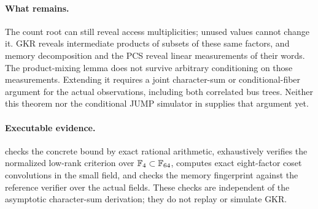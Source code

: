 \paragraph{What remains.} The count root can still reveal access multiplicities; unused values cannot change it. GKR reveals intermediate products of subsets of these same factors, and memory decomposition and the PCS reveal linear measurements of their words. The product-mixing lemma does not survive arbitrary conditioning on those measurements. Extending it requires a joint character-sum or conditional-fiber argument for the actual observations, including both correlated bus trees. Neither this theorem nor the conditional JUMP simulator in  supplies that argument yet.

\paragraph{Executable evidence.}  checks the concrete bound by exact rational arithmetic, exhaustively verifies the normalized low-rank criterion over $\mathbb{F}_4\subset\mathbb{F}_{64}$, computes exact eight-factor coset convolutions in the small field, and checks the memory fingerprint against the reference verifier over the actual fields. These checks are independent of the asymptotic character-sum derivation; they do not replay or simulate GKR.
